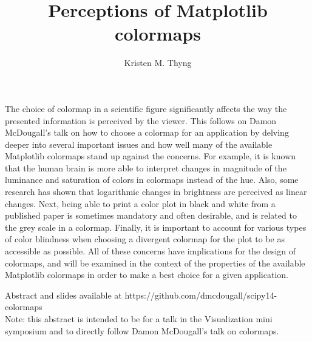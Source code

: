 \documentclass[11pt]{article}
\title{Perceptions of Matplotlib colormaps}
\author{Kristen M. Thyng}
\date{}
\begin{document}
\maketitle


The choice of colormap in a scientific figure significantly affects the way the presented information is perceived by the viewer. This follows on Damon McDougall's talk on how to choose a colormap for an application by delving deeper into several important issues and how well many of the available Matplotlib colormaps stand up against the concerns. For example, it is known that the human brain is more able to interpret changes in magnitude of the luminance and saturation of colors in colormaps instead of the hue. Also, some research has shown that logarithmic changes in brightness are perceived as linear changes. Next, being able to print a color plot in black and white from a published paper is sometimes mandatory and often desirable, and is related to the grey scale in a colormap. Finally, it is important to account for various types of color blindness when choosing a divergent colormap for the plot to be as accessible as possible. All of these concerns have implications for the design of colormaps, and will be examined in the context of the properties of the available Matplotlib colormaps in order to make a best choice for a given application.

Abstract and slides available at https://github.com/dmcdougall/scipy14-colormaps \\

Note: this abstract is intended to be for a talk in the Visualization mini symposium and to directly follow Damon McDougall's talk on colormaps.
\end{document}
